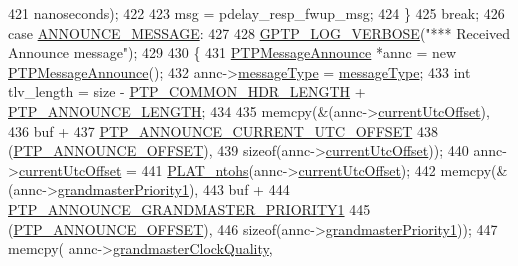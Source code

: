 \begin{DoxyCode}
{{{{{{{{421                  nanoseconds);
422 
423             msg = pdelay\_resp\_fwup\_msg;
424         \}
425         \textcolor{keywordflow}{break};
426     \textcolor{keywordflow}{case} \hyperlink{avbts__message_8hpp_ac6606ebe91c8ac66a2c314c79f5ab013a4c8d615c4de8a7fc2ea24b5eff2811ef}{ANNOUNCE\_MESSAGE}:
427 
428         \hyperlink{gptp__log_8hpp_add03384a2a8099b27e07d041cce77e6f}{GPTP\_LOG\_VERBOSE}(\textcolor{stringliteral}{"*** Received Announce message"});
429 
430         \{
431             \hyperlink{class_p_t_p_message_announce}{PTPMessageAnnounce} *annc = \textcolor{keyword}{new} \hyperlink{class_p_t_p_message_announce}{PTPMessageAnnounce}();
432             annc->\hyperlink{class_p_t_p_message_common_adb32627aa5b0e2dbad3ccd88aab07c05}{messageType} = \hyperlink{class_p_t_p_message_common_adb32627aa5b0e2dbad3ccd88aab07c05}{messageType};
433             \textcolor{keywordtype}{int} tlv\_length = size - \hyperlink{avbts__message_8hpp_a8ec4d965b7b1e83844f1c17f12e9b8e4}{PTP\_COMMON\_HDR\_LENGTH} + 
      \hyperlink{avbts__message_8hpp_ad800b5cd5359d021054af8e902100ba7}{PTP\_ANNOUNCE\_LENGTH};
434 
435             memcpy(&(annc->\hyperlink{class_p_t_p_message_announce_a4ee8eca04b1ccd7d8eaae5f0dd3a11fa}{currentUtcOffset}),
436                    buf +
437                    \hyperlink{avbts__message_8hpp_acd887e469bb001b97f8eef87a997ae59}{PTP\_ANNOUNCE\_CURRENT\_UTC\_OFFSET}
438                    (\hyperlink{avbts__message_8hpp_aaa3da4fa4e9e4cfe49477cd7f6b95bca}{PTP\_ANNOUNCE\_OFFSET}),
439                    \textcolor{keyword}{sizeof}(annc->\hyperlink{class_p_t_p_message_announce_a4ee8eca04b1ccd7d8eaae5f0dd3a11fa}{currentUtcOffset}));
440             annc->\hyperlink{class_p_t_p_message_announce_a4ee8eca04b1ccd7d8eaae5f0dd3a11fa}{currentUtcOffset} =
441                 \hyperlink{linux_2src_2platform_8cpp_a6b8f3e7b87b66fa774a07ddc67f883a7}{PLAT\_ntohs}(annc->\hyperlink{class_p_t_p_message_announce_a4ee8eca04b1ccd7d8eaae5f0dd3a11fa}{currentUtcOffset});
442             memcpy(&(annc->\hyperlink{class_p_t_p_message_announce_a93988c82dd819cc976c32f9e006b97e3}{grandmasterPriority1}),
443                    buf +
444                    \hyperlink{avbts__message_8hpp_acd2f076b6ef0a6a45ac42baf1aecd300}{PTP\_ANNOUNCE\_GRANDMASTER\_PRIORITY1}
445                    (\hyperlink{avbts__message_8hpp_aaa3da4fa4e9e4cfe49477cd7f6b95bca}{PTP\_ANNOUNCE\_OFFSET}),
446                    \textcolor{keyword}{sizeof}(annc->\hyperlink{class_p_t_p_message_announce_a93988c82dd819cc976c32f9e006b97e3}{grandmasterPriority1}));
447             memcpy( annc->\hyperlink{class_p_t_p_message_announce_aa67cf6cb88ed67b2850993312a7cd5f2}{grandmasterClockQuality},
}}}}}}}}
\end{DoxyCode}
